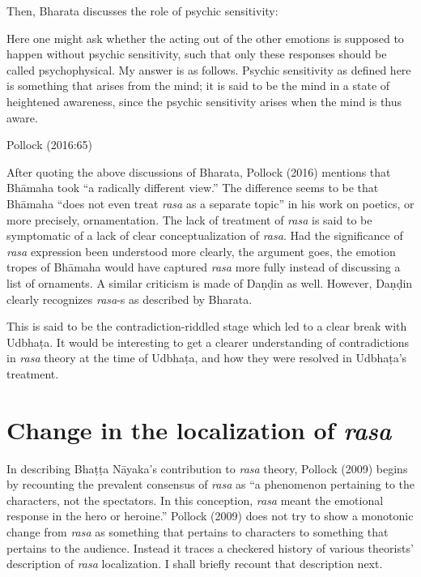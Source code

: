 Then, Bharata discusses the role of psychic sensitivity:

\begin{myquote}
[373.3] Here one might ask whether the acting out of the other emotions is supposed to happen without psychic sensitivity, such that only these responses should be called psychophysical. My answer is as follows. Psychic sensitivity as defined here is something that arises from the mind; it is said to be the mind in a state of heightened awareness, since the psychic sensitivity arises when the mind is thus aware.

\hfill Pollock (2016:65)
\end{myquote}

After quoting the above discussions of Bharata, Pollock (2016) mentions that Bhāmaha took “a radically different view.” The difference seems to be that Bhāmaha “does not even treat \textsl{rasa} as a separate topic” in his work on poetics, or more precisely, ornamentation. The lack of treatment of \textsl{rasa} is said to be symptomatic of a lack of clear conceptualization of \textsl{rasa}. Had the significance of \textsl{rasa} expression been understood more clearly, the argument goes, the emotion tropes of Bhāmaha would have captured \textsl{rasa} more fully instead of discussing a list of ornaments. A similar criticism is made of Daṇḍin as well. However, Daṇḍin clearly recognizes \textsl{rasa}-s as described by Bharata. 

This is said to be the contradiction-riddled stage which led to a clear break with Udbhaṭa. It would be interesting to get a clearer understanding of contradictions in \textsl{rasa} theory at the time of Udbhaṭa, and how they were resolved in Udbhaṭa’s treatment. 

\section*{Change in the localization of \textsl{rasa}}

In describing Bhaṭṭa Nāyaka’s contribution to \textsl{rasa }theory, Pollock (2009) begins by recounting the prevalent consensus of \textsl{rasa} as “a phenomenon pertaining to the characters, not the spectators. In this conception, \textsl{rasa }meant the emotional response in the hero or heroine.” Pollock (2009) does not try to show a monotonic change from \textsl{rasa} as something that pertains to characters to something that pertains to the audience. Instead it traces a checkered history of various theorists’ description of \textsl{rasa} localization. I shall briefly recount that description next. 

